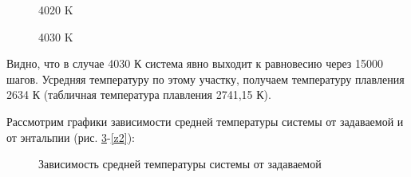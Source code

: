 \documentclass[a4paper,oneside,14pt]{extreport}
\begin{document}
\begin{figure}[!h]
	\caption{4020 K}
	\label{untitled2}
\end{figure}

\begin{figure}[!h]
	\caption{4030 K}
	\label{untitled3}
\end{figure}

\newpage
Видно, что в случае 4030 К система явно выходит к равновесию через 15000 шагов. Усредняя температуру по этому участку, получаем температуру плавления 2634 К
(табличная температура плавления 2741,15 К).

Рассмотрим графики зависимости средней температуры системы от задаваемой и от энтальпии (рис. \ref{z1}-\ref{z2}):

\begin{figure}[!h]
	\caption{Зависимость средней температуры системы от задаваемой}
	\label{z1}
\end{figure}
\end{document}
